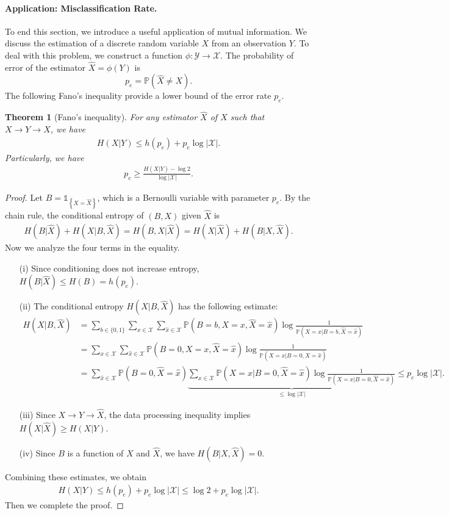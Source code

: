 \documentclass{article}
\numberwithin{equation}{section}
\newcommand{\bbP}{\mathbb{P}}
\renewcommand{\cal}{\mathcal}
\newcommand{\wh}{\widehat}
\theoremstyle{plain}
\newtheorem{theorem}{Theorem}[section]
\theoremstyle{definition}
\begin{document}
\paragraph{Application: Misclassification Rate.} To end this section, we introduce a useful application of mutual information. We discuss the estimation of a discrete random variable $X$ from an observation $Y$. To deal with this problem, we construct a function $\phi:\mathcal{Y}\to\mathcal{X}$. The probability of error of the estimator $\wh{X}=\phi(Y)$ is $$p_e=\bbP(\wh{X}\neq X).$$
The following Fano's inequality provide a lower bound of the error rate $p_e$.
\begin{theorem}[Fano's inequality]\label{fanoineq}
For any estimator $\wh{X}$ of $X$ such that $X\to Y\to\wh{X}$, we have
\begin{align*}
	H(X|Y)\leq h(p_e)+p_e\log\vert\cal{X}\vert.
\end{align*}
Particularly, we have
\begin{align*}
	p_e\geq\frac{H(X|Y)-\log 2}{\log\vert\mathcal{X}\vert}.
\end{align*}
\end{theorem} 
\begin{proof}
Let $B=\mathds{1}_{\left\{X=\wh{X}\right\}}$, which is a Bernoulli variable with parameter $p_e$. By the chain rule, the conditional entropy of $(B,X)$ given $\wh{X}$ is
\begin{align*}
	H(B|\wh{X})+H(X|B,\wh{X})=H(B,X|\wh{X})=H(X|\wh{X})+H(B|X,\wh{X}).
\end{align*}
Now we analyze the four terms in the equality.

\begin{itemize}
	\item[(i)] Since conditioning does not increase entropy, $H(B|\wh{X})\leq H(B)=h(p_e)$.
	\item[(ii)] The conditional entropy $H(X|B,\wh{X})$ has the following estimate:
	\begin{align*}
		H(X|B,\wh{X})&=\sum_{b\in\{0,1\}}\sum_{x\in\cal{X}}\sum_{\wh{x}\in\cal{X}}\bbP(B=b,X=x,\wh{X}=\wh{x})\log\frac{1}{\bbP(X=x|B=b,\wh{X}=\wh{x})}\\
		&=\sum_{x\in\cal{X}}\sum_{\wh{x}\in\cal{X}}\bbP(B=0,X=x,\wh{X}=\wh{x})\log\frac{1}{\bbP(X=x|B=0,\wh{X}=\wh{x})}\\
		&=\sum_{\wh{x}\in\cal{X}}\bbP(B=0,\wh{X}=\wh{x})\underbrace{\sum_{x\in\cal{X}}\bbP(X=x|B=0,\wh{X}=\wh{x})\log\frac{1}{\bbP(X=x|B=0,\wh{X}=\wh{x})}}_{\leq\log\vert\cal{X}\vert}\leq p_e\log\vert\cal{X}\vert.
	\end{align*}
	\item[(iii)] Since $X\to Y\to\wh{X}$, the data processing inequality implies $H(X|\wh{X})\geq H(X|Y)$.
	\item[(iv)] Since $B$ is a function of $X$ and $\wh{X}$, we have $H(B|X,\wh{X})=0$.
\end{itemize}
Combining these estimates, we obtain
\begin{align*}
	H(X|Y)\leq h(p_e)+p_e\log\vert\cal{X}\vert\leq \log 2 +p_e\log\vert\cal{X}\vert.
\end{align*}
Then we complete the proof.
\end{proof}
\end{document}
